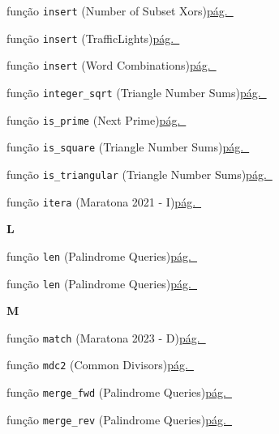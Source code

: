 \documentclass[10pt, a4paper, twocolumn, landscape]{article}
\begin{document}
{\noindent função \texttt{insert} {\scriptsize\color{codegray}(Number of Subset Xors)}\dotfill\hyperref[fn70]{pág.~\pageref*{fn70}}\par
\noindent função \texttt{insert} {\scriptsize\color{codegray}(TrafficLights)}\dotfill\hyperref[fn85]{pág.~\pageref*{fn85}}\par
\noindent função \texttt{insert} {\scriptsize\color{codegray}(Word Combinations)}\dotfill\hyperref[fn29]{pág.~\pageref*{fn29}}\par
\noindent função \texttt{integer\_sqrt} {\scriptsize\color{codegray}(Triangle Number Sums)}\dotfill\hyperref[fn80]{pág.~\pageref*{fn80}}\par
\noindent função \texttt{is\_prime} {\scriptsize\color{codegray}(Next Prime)}\dotfill\hyperref[fn74]{pág.~\pageref*{fn74}}\par
\noindent função \texttt{is\_square} {\scriptsize\color{codegray}(Triangle Number Sums)}\dotfill\hyperref[fn81]{pág.~\pageref*{fn81}}\par
\noindent função \texttt{is\_triangular} {\scriptsize\color{codegray}(Triangle Number Sums)}\dotfill\hyperref[fn82]{pág.~\pageref*{fn82}}\par
\noindent função \texttt{itera} {\scriptsize\color{codegray}(Maratona 2021 - I)}\dotfill\hyperref[fn92]{pág.~\pageref*{fn92}}\par
\par\medskip\textbf{\large L}\par
\noindent função \texttt{len} {\scriptsize\color{codegray}(Palindrome Queries)}\dotfill\hyperref[fn59]{pág.~\pageref*{fn59}}\par
\noindent função \texttt{len} {\scriptsize\color{codegray}(Palindrome Queries)}\dotfill\hyperref[fn61]{pág.~\pageref*{fn61}}\par
\par\medskip\textbf{\large M}\par
\noindent função \texttt{match} {\scriptsize\color{codegray}(Maratona 2023 - D)}\dotfill\hyperref[fn95]{pág.~\pageref*{fn95}}\par
\noindent função \texttt{mdc2} {\scriptsize\color{codegray}(Common Divisors)}\dotfill\hyperref[fn2]{pág.~\pageref*{fn2}}\par
\noindent função \texttt{merge\_fwd} {\scriptsize\color{codegray}(Palindrome Queries)}\dotfill\hyperref[fn62]{pág.~\pageref*{fn62}}\par
\noindent função \texttt{merge\_rev} {\scriptsize\color{codegray}(Palindrome Queries)}\dotfill\hyperref[fn63]{pág.~\pageref*{fn63}}\par
}
\end{document}
